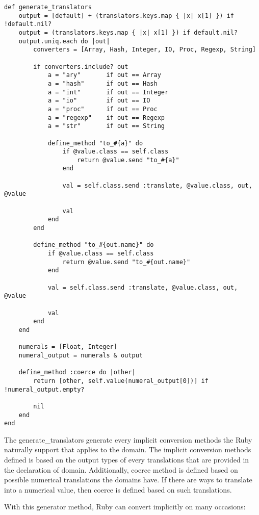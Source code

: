 \begin{lstlisting}[caption={Implicit conversion: implicit conversion methods}]
def generate_translators
    output = [default] + (translators.keys.map { |x| x[1] }) if !default.nil?
    output = (translators.keys.map { |x| x[1] }) if default.nil?
    output.uniq.each do |out|
        converters = [Array, Hash, Integer, IO, Proc, Regexp, String]

        if converters.include? out
            a = "ary"       if out == Array
            a = "hash"      if out == Hash
            a = "int"       if out == Integer
            a = "io"        if out == IO
            a = "proc"      if out == Proc
            a = "regexp"    if out == Regexp
            a = "str"       if out == String
                
            define_method "to_#{a}" do
                if @value.class == self.class
                    return @value.send "to_#{a}"
                end

                val = self.class.send :translate, @value.class, out, @value

                val
            end
        end

        define_method "to_#{out.name}" do
            if @value.class == self.class
                return @value.send "to_#{out.name}"
            end

            val = self.class.send :translate, @value.class, out, @value

            val
        end
    end

    numerals = [Float, Integer]
    numeral_output = numerals & output

    define_method :coerce do |other|
        return [other, self.value(numeral_output[0])] if !numeral_output.empty?

        nil
    end
end
\end{lstlisting}

The generate\_translators generate every implicit conversion methods the Ruby naturally support that applies to the domain.  The implicit conversion methods defined is based on the output types of every translations that are provided in the declaration of domain.  Additionally, coerce method is defined based on possible numerical translations the domains have.  If there are ways to translate into a numerical value, then coerce is defined based on such translations.

With this generator method, Ruby can convert implicitly on many occasions:


